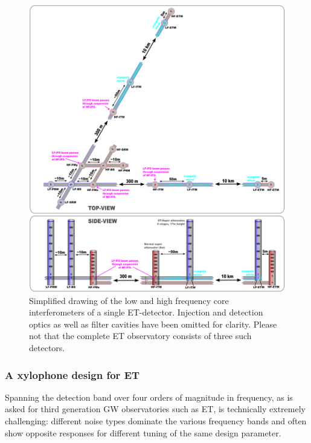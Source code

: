 \begin{figure}[p]
\centering
\includegraphics[width=1\textwidth]{Detector/Optics/OpticalLayout/OpticalLayoutFigures/ET_April2011_v2.png}
\caption{Simplified drawing of the low and high frequency core interferometers of a single ET-detector. Injection and detection optics as well as filter cavities have been omitted for clarity. Please not that the complete ET observatory consists of three such detectors.%
}
\label{Fig:Simple_ETv1}
\end{figure}

\subsubsection{A xylophone design for ET}\label{sec:xylophone} 
Spanning the detection band over four orders of magnitude in frequency, as is asked for third generation GW observatories such as ET, is technically extremely challenging: different noise types dominate the various frequency bands and often show opposite responses for different tuning of the same design parameter.

